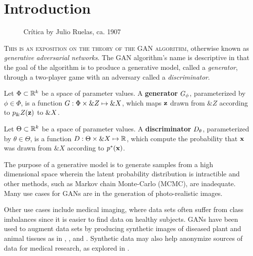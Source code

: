 \section{Introduction}%
\setcounter{page}{1}

\vspace{1cm}

\begin{figure}[h]
  \label{fig:paradise} \centering
{}
  \caption{Crítica by Julio Ruelas, ca. 1907}
\end{figure}

\vspace{1cm}

\lettrine[lines=3]{\Royal T}{his is an exposition on the theory of the
GAN algorithm}, otherwise known as \textit{generative adversarial
networks}. The GAN algorithm's name is descriptive in that the goal of
the algorithm is to produce a generative model, called a
\textit{generator}, through a two-player game with an adversary called
a \textit{discriminator}.

\begin{definition}
  \label{def:generator} Let $\Phi \subset \mathbb{R}^k$ be a space of
parameter values. A \textbf{generator} $G_\phi$, parameterized by $\phi
\in \Phi$, is a function $G: \Phi \times \&Z \mapsto \&X$, which
maps $\mathbf{z}$ drawn from $\&Z$ according to $p_\&Z(\mathbf{z})$ to $\&X$.
\end{definition}

\begin{definition}
  \label{def:discriminator} Let $\Theta \subset \mathbb{R}^k$ be a space of
parameter values. A \textbf{discriminator} $D_\theta$, parameterized by
$\theta \in \Theta$, is a function $D: \Theta \times \&X \mapsto
\mathbb{R}$, which compute the probability that $\mathbf{x}$ was drawn from $\&X$
according to $p^*(\mathbf{x})$.
\end{definition}

The purpose of a generative model is to generate samples from a high
dimensional space wherein the latent probability distribution is
intractible and other methods, such as Markov chain Monte-Carlo
(MCMC), are inadequate. Many use cases for GANs are in the generation
of photo-realistic images.

Other use cases include medical imaging, where data sets often suffer
from class imbalances since it is easier to find data on healthy
subjects. GANs have been used to augment data sets by producing
synthetic images of diseased plant and animal tissues as in
\cite{ref:nazki-2018}, \cite{ref:valerio-2017}, and
\cite{ref:frid-2018}. Synthetic data may also help anonymize sources
of data for medical research, as explored in \cite{ref:shin-2018}.

